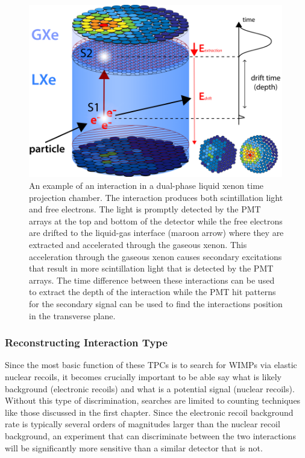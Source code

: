 \begin{figure}[t]
	\centering
	\includegraphics[width=0.99\textwidth]{tpc_principle}
	\caption{An example of an interaction in a dual-phase liquid xenon time projection chamber.  The interaction produces both scintillation light and free electrons.  The light is promptly detected by the PMT arrays at the top and bottom of the detector while the free electrons are drifted to the liquid-gas interface (maroon arrow) where they are extracted and accelerated through the gaseous xenon.  This acceleration through the gaseous xenon causes secondary excitations that result in more scintillation light that is detected by the PMT arrays.  The time difference between these interactions can be used to extract the depth of the interaction while the PMT hit patterns for the secondary signal can be used to find the interactions position in the transverse plane.}
	\label{fig:tpc_principle}
\end{figure}


\subsubsection{Reconstructing Interaction Type}

Since the most basic function of these TPCs is to search for WIMPs via elastic nuclear recoils, it becomes crucially important to be able say what is likely background (electronic recoils) and what is a potential signal (nuclear recoils).  Without this type of discrimination, searches are limited to counting techniques like those discussed in the first chapter.  Since the electronic recoil background rate is typically several orders of magnitudes larger than the nuclear recoil background, an experiment that can discriminate between the two interactions will be significantly more sensitive than a similar detector that is not.

